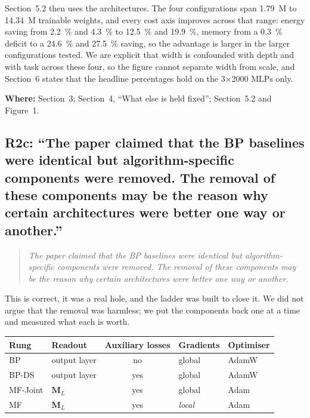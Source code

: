 \documentclass[11pt,a4paper]{article}
\newcommand{\MF}{MF}
\newcommand{\BP}{BP}
\newcommand{\BPDS}{BP-DS}
\newcommand{\MFJ}{MF-Joint}
\newenvironment{comment}%
  {\begin{quote}\itshape\small}%
  {\end{quote}}
\newcommand{\where}[1]{\par\smallskip\noindent\textbf{Where:} #1\par}
\begin{document}
Section~5.2 then uses the architectures. The four configurations span
\num{1.79}~M to \num{14.34}~M trainable weights, and every cost axis improves
across that range: energy saving from \SI{2.2}{\percent} and
\SI{4.3}{\percent} to \SI{12.5}{\percent} and \SI{19.9}{\percent}, memory from
a \SI{0.3}{\percent} deficit to a \SI{24.6}{\percent} and \SI{27.5}{\percent}
saving, so the advantage is larger in the larger configurations tested. We
are explicit that width is confounded with depth and with task across these
four, so the figure cannot separate width from scale, and Section~6 states that
the headline percentages hold on the \num{3}$\times$\num{2000} MLPs only.

\where{Section~3; Section~4, ``What else is held fixed''; Section~5.2 and
Figure~1.}

\subsection*{R2c: ``The paper claimed that the BP baselines were identical
but algorithm-specific components were removed. The removal of these
components may be the reason why certain architectures were better one way or
another.''}

\begin{comment}
The paper claimed that the BP baselines were identical but algorithm-specific
components were removed. The removal of these components may be the reason why
certain architectures were better one way or another.
\end{comment}

\noindent
This is correct, it was a real hole, and the ladder was built to close it. We
did not argue that the removal was harmless; we put the components back one at
a time and measured what each is worth.

\begin{center}\small
\begin{tabular}{llcll}
  \toprule
  Rung & Readout & Auxiliary losses & Gradients & Optimiser \\
  \midrule
  \BP{}    & output layer & no  & global & AdamW \\
  \BPDS{}  & output layer & yes & global & AdamW \\
  \MFJ{}   & $\mathbf{M}_L$ & yes & global & Adam \\
  \MF{}    & $\mathbf{M}_L$ & yes & \emph{local} & Adam \\
  \bottomrule
\end{tabular}
\end{center}
\end{document}
